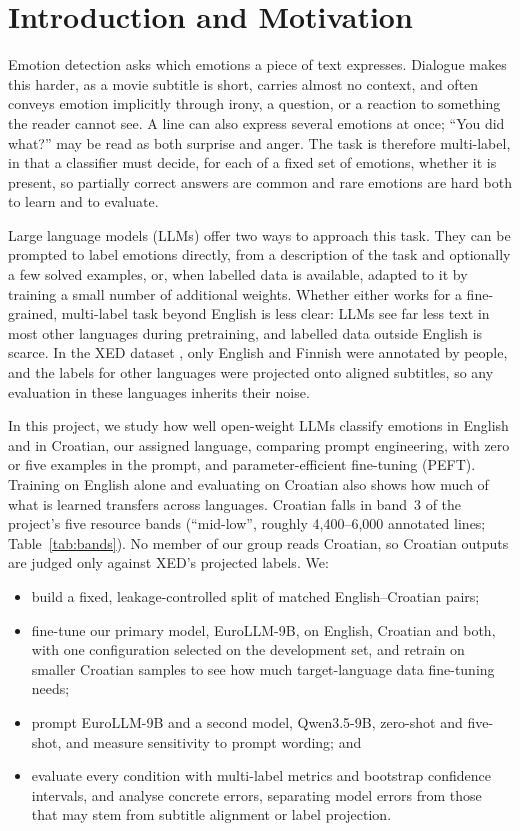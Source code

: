 \section{Introduction and Motivation}
\label{sec:introduction}

Emotion detection asks which emotions a piece of text expresses. Dialogue makes this harder, as a movie subtitle is short, carries almost no context, and often conveys emotion implicitly through irony, a question, or a reaction to something the reader cannot see. A line can also express several emotions at once; ``You did what?'' may be read as both surprise and anger. The task is therefore multi-label, in that a classifier must decide, for each of a fixed set of emotions, whether it is present, so partially correct answers are common and rare emotions are hard both to learn and to evaluate.

Large language models (LLMs) offer two ways to approach this task. They can be prompted to label emotions directly, from a description of the task and optionally a few solved examples, or, when labelled data is available, adapted to it by training a small number of additional weights. Whether either works for a fine-grained, multi-label task beyond English is less clear: LLMs see far less text in most other languages during pretraining, and labelled data outside English is scarce. In the XED dataset \parencite{ohman2020xed}, only English and Finnish were annotated by people, and the labels for other languages were projected onto aligned subtitles, so any evaluation in these languages inherits their noise.

In this project, we study how well open-weight LLMs classify emotions in English and in Croatian, our assigned language, comparing prompt engineering, with zero or five examples in the prompt, and parameter-efficient fine-tuning (PEFT). Training on English alone and evaluating on Croatian also shows how much of what is learned transfers across languages. Croatian falls in band~3 of the project's five resource bands (``mid-low'', roughly 4,400--6,000 annotated lines; Table~\ref{tab:bands}). No member of our group reads Croatian, so Croatian outputs are judged only against XED's projected labels. We:

\begin{itemize}
    \item build a fixed, leakage-controlled split of matched English--Croatian pairs;
    \item fine-tune our primary model, EuroLLM-9B, on English, Croatian and both, with one configuration selected on the development set, and retrain on smaller Croatian samples to see how much target-language data fine-tuning needs;
    \item prompt EuroLLM-9B and a second model, Qwen3.5-9B, zero-shot and five-shot, and measure sensitivity to prompt wording; and
    \item evaluate every condition with multi-label metrics and bootstrap confidence intervals, and analyse concrete errors, separating model errors from those that may stem from subtitle alignment or label projection.
\end{itemize}

